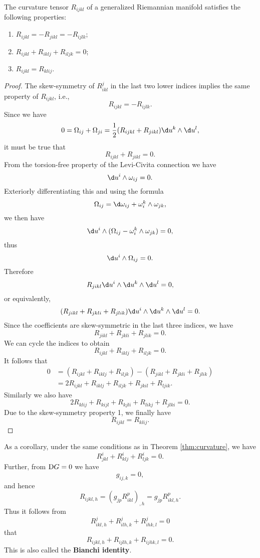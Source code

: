 \documentclass[11pt]{article}
\begin{document}
\begin{theorem}\label{thm:curvature}
    The curvature tensor $R_{ijkl}$ of a generalized Riemannian manifold satisfies the following properties:
    \begin{enumerate}
        \item $R_{ijkl} = -R_{jikl} = -R_{ijlk}$;
        \item $R_{ijkl} + R_{iklj} + R_{iljk} = 0$;
        \item $R_{ijkl} = R_{klij}$.
    \end{enumerate}
\end{theorem}
\begin{proof}
    The skew-symmetry of $R^j_{ikl}$ in the last two lower indices implies the same property of $R_{ijkl}$, i.e., $$R_{ijkl} = -R_{ijlk}.$$ Since we have $$0 = \Omega_{ij} + \Omega_{ji} = \frac{1}{2}(R_{ijkl} + R_{jikl})\d u^k \wedge \d u^l,$$ it must be true that $$R_{ijkl} + R_{jikl} = 0.$$ From the torsion-free property of the Levi-Civita connection we have $$\d u^i \wedge \omega_{ij} = 0.$$ Exteriorly differentiating this and using the formula $$\Omega_{ij} = \d\omega_{ij} + \omega^k_i \wedge \omega_{jk},$$ we then have $$\d u^i \wedge (\Omega_{ij} - \omega^k_i \wedge \omega_{jk}) = 0,$$ thus $$\d u^i \wedge \Omega_{ij} = 0.$$ Therefore $$R_{jikl} \d u^i \wedge \d u^k \wedge \d u^l = 0,$$ or equivalently, $$(R_{jikl} + R_{jkli} + R_{jlik})\d u^i \wedge \d u^k \wedge \d u^l = 0.$$ Since the coefficients are skew-symmetric in the last three indices, we have $$R_{jikl} + R_{jkli} + R_{jlik} = 0.$$ We can cycle the indices to obtain $$R_{ijkl} + R_{iklj} + R_{iljk} = 0.$$ It follows that
    \begin{align*}
        0 &= (R_{ijkl} + R_{iklj} + R_{iljk}) - (R_{jikl} + R_{jkli} + R_{jlik}) \\
        &= 2R_{ijkl} + R_{iklj} + R_{iljk} + R_{jkil} + R_{ljik}.
    \end{align*}
    Similarly we also have $$2R_{klij} + R_{kijl} + R_{kjli} + R_{likj} + R_{jlki} = 0.$$ Due to the skew-symmetry property 1, we finally have $$R_{ijkl} = R_{klij}.$$
\end{proof}

As a corollary, under the same conditions as in Theorem \ref{thm:curvature}, we have $$R^i_{jkl} + R^i_{klj} + R^i_{ljk} = 0.$$ Further, from $\text{D} G = 0$ we have $$g_{ij, k} = 0,$$ and hence $$R_{ijkl, h} = (g_{jp}R^p_{ikl})_{, h} = g_{jp}R^p_{ikl, h}.$$ Thus it follows from $$R^j_{ikl, h} + R^j_{ilh, k} + R^j_{ihk, l} = 0$$ that $$R_{ijkl, h} + R_{ijlh, k} + R_{ijhk, l} = 0.$$ This is also called the \textbf{Bianchi identity}. 
\end{document}
